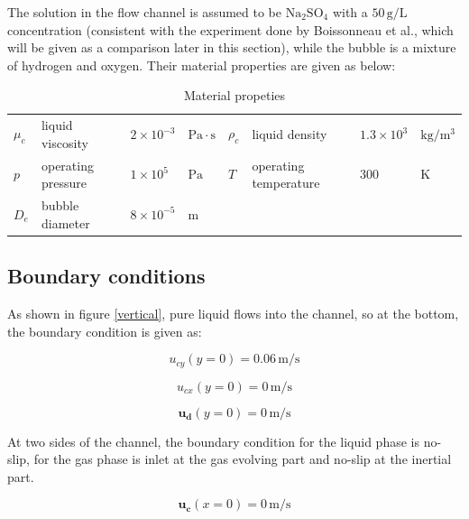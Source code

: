 The solution in the flow channel is assumed to be $\mathrm{ Na_2SO_4 }$ with a $50 \, \mathrm{g/L}$ concentration (consistent with the experiment done by Boissonneau et al.\cite{Boissonneau2000}, which will be given as a comparison later in this section), while the bubble is a mixture of hydrogen and oxygen. Their material properties are given as below:


\begin{table}[h!]
\centering
\caption{Material propeties}
\label{materialpropeties}
\begin{tabular}{l l l l| l l l l}
\hline
    $\mu_c$  & liquid viscosity & $2 \times 10^{-3}$ & $\mathrm{ Pa \cdot s }$  &  $\rho_c$ & liquid density & $1.3 \times 10^{3}$ & $\mathrm{ kg/m^3 }$ \\

    $p$  & operating pressure & $1 \times 10^5$  & $\mathrm{ Pa }$ & $T$ & operating temperature& $300$ & $\mathrm{ \mathrm{K} }$\\
    
    $D_e$ & bubble diameter & $8 \times 10^{-5}$ & $\mathrm{ m }$ \\
    
\hline
\end{tabular}
\end{table}


\subsection{Boundary conditions}

As shown in figure \ref{vertical}, pure liquid flows into the channel,  so at the bottom, the boundary condition is given as:

\begin{equation}
    u_{cy}(y=0) = 0.06 \, \mathrm{m/s}     
\end{equation}

\begin{equation}
    u_{cx}(y=0) = 0 \, \mathrm{ m/s }
\end{equation}

\begin{equation}
    \mathbf{u_d}(y=0) = 0 \, \mathrm{ m/s }
\end{equation}

At two sides of the channel, the boundary condition for the liquid phase is no-slip, for the gas phase is inlet at the gas evolving part and no-slip at the inertial part.


\begin{equation}
    \mathbf{u_{c}}(x = 0) = 0 \, \mathrm{ m/s }
\end{equation}

